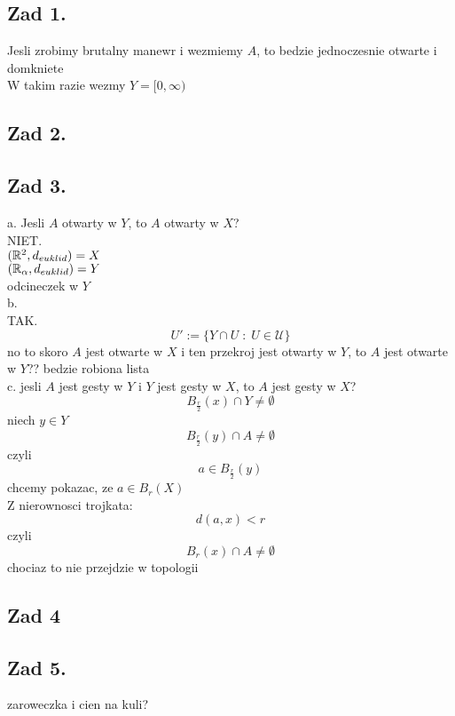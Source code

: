 \documentclass{article}
\begin{document}
\ttfamily
\subsection*{Zad 1.}
    Jesli zrobimy brutalny manewr i wezmiemy $A$, to bedzie jednoczesnie otwarte i domkniete \kotecek\medskip\\
    W takim razie wezmy $Y=[0, \infty)$
\subsection*{Zad 2. }
\subsection*{Zad 3.}
    {\Large\color{tit}a. Jesli $A$ otwarty w $Y$, to $A$ otwarty w $X$?}\medskip\\
    NIET.\\
    $(\mathbb{R}^2, d_{euklid})=X$\\
    $(\mathbb{R}_\alpha, d_{euklid})=Y$\\
    odcineczek w $Y$ \bigskip\\
    {\Large\color{tit}b.}\medskip\\
    TAK.\\
    $$U':=\{Y\cap U\;:\;U\in \mathcal{U}\}$$
    no to skoro $A$ jest otwarte w $X$ i ten przekroj jest otwarty w $Y$, to $A$ jest otwarte w $Y$?? bedzie robiona lista\\\kondow\bigskip
    {\Large\color{tit}c. jesli $A$ jest gesty w $Y$ i $Y$ jest gesty w $X$, to $A$ jest gesty w $X$?}
    $$B_\frac{r}2(x)\cap Y\neq\emptyset$$
    niech $y\in Y$
    $$B_\frac{r}2(y)\cap A\neq\emptyset$$
    czyli
    $$a\in B_\frac{r}2(y)$$
    chcemy pokazac, ze $a\in B_r(X)$\\
    Z nierownosci trojkata:
    $$d(a,x)< r$$
    czyli
    $$B_r(x)\cap A\neq \emptyset$$
    \kondow
    chociaz to nie przejdzie w topologii
\subsection*{Zad 4}
\subsection*{Zad 5.}
zaroweczka i cien na kuli?
\end{document}
